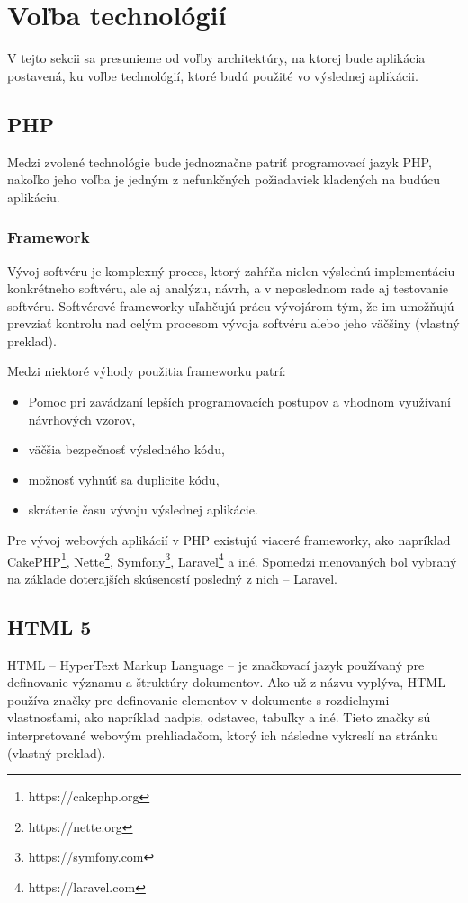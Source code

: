 \pagebreak

\section{Voľba technológií}
V tejto sekcii sa presunieme od voľby architektúry, na ktorej bude aplikácia postavená, ku voľbe technológií, ktoré budú použité vo výslednej aplikácii.

\subsection{PHP}
Medzi zvolené technológie bude jednoznačne patriť programovací jazyk PHP, nakoľko jeho voľba je jedným z nefunkčných požiadaviek kladených na budúcu aplikáciu. 

\subsubsection*{Framework}
Vývoj softvéru je komplexný proces, ktorý zahŕňa nielen výslednú implementáciu konkrétneho softvéru, ale aj analýzu, návrh, a v neposlednom rade aj testovanie softvéru. Softvérové frameworky uľahčujú prácu vývojárom tým, že im umožňujú prevziať kontrolu nad celým procesom vývoja softvéru alebo jeho väčšiny \cite{co-je-framework} (vlastný preklad).

Medzi niektoré výhody použitia frameworku patrí:

\begin{itemize}
	\item Pomoc pri zavádzaní lepších programovacích postupov a vhodnom využívaní návrhových vzorov,
	\item väčšia bezpečnosť výsledného kódu,
	\item možnosť vyhnúť sa duplicite kódu,
	\item skrátenie času vývoju výslednej aplikácie.
\end{itemize}

Pre vývoj webových aplikácií v PHP existujú viaceré frameworky, ako napríklad CakePHP\footnote{https://cakephp.org}, Nette\footnote{https://nette.org}, Symfony\footnote{https://symfony.com}, Laravel\footnote{https://laravel.com} a iné.
Spomedzi menovaných bol vybraný na základe doterajších skúseností posledný z nich -- Laravel.

\subsection{HTML 5}
HTML -- HyperText Markup Language -- je značkovací jazyk používaný pre definovanie významu a štruktúry dokumentov. Ako už z názvu vyplýva, HTML používa značky pre definovanie elementov v dokumente s rozdielnymi vlastnosťami, ako napríklad nadpis, odstavec, tabuľky a iné.
Tieto značky sú interpretované webovým prehliadačom, ktorý ich následne vykreslí na stránku \cite{co-je-html} (vlastný preklad).

